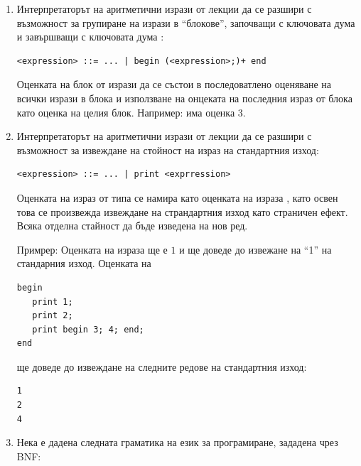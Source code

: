 \begin{enumerate}[resume]
\item Интерпретаторът на аритметични изрази от лекции да се разшири с възможност за групиране на изрази в ``блокове'', започващи с ключовата дума  и завършващи с ключовата дума :
\begin{flushleft}
  \begin{lstlisting}[mathescape]
<expression> ::= ... | begin (<expression>;)+ end
  \end{lstlisting}
\end{flushleft}

Оценката на блок от изрази да се състои в последоватлено оценяване на всички изрази в блока и използване на онцеката на последния израз от блока като оценка на целия блок. Например:  има оценка $3$.

\item Интерпретаторът на аритметични изрази от лекции да се разшири с възможност за извеждане на стойност на израз на стандартния изход:
\begin{flushleft}
  \begin{lstlisting}[mathescape]
<expression> ::= ... | print <exprression>
  \end{lstlisting}
\end{flushleft}

Оценката на израз от типа  се намира като оценката на израза , като освен това се произвежда извеждане на страндартния изход като страничен ефект. Всяка отделна стайност да бъде изведена на нов ред.

Примрер: Оценката на израза  ще е $1$ и ще доведе до извежане на ``1'' на стандарния изход. Оценката на 

\begin{flushleft}
  \begin{lstlisting}[mathescape]
begin 
   print 1; 
   print 2; 
   print begin 3; 4; end;
end
  \end{lstlisting}
\end{flushleft}
ще доведе до извеждане на следните редове на стандартния изход: 
\begin{flushleft}
  \begin{lstlisting}[mathescape]
1
2
4
  \end{lstlisting}
\end{flushleft}

\item Нека е дадена следната граматика на език за програмиране, зададена чрез BNF:


\end{enumerate}
